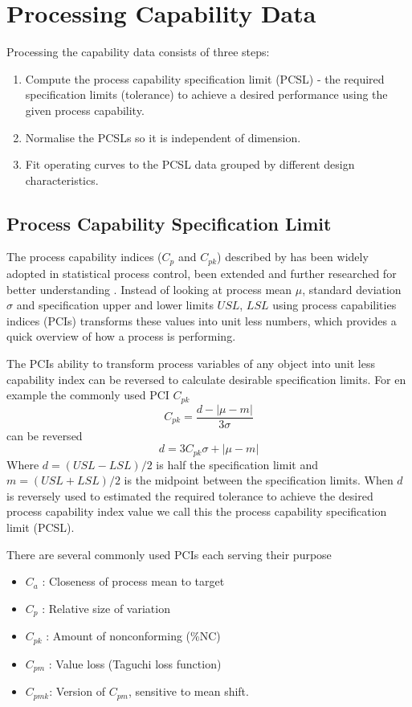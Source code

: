\documentclass[aip,amsmath, reprint, author-year]{revtex4-1}
\begin{document}
\section{Processing Capability Data}

Processing the capability data consists of three steps: 

\begin{enumerate}
	\item Compute the process capability specification limit (PCSL) - the required specification limits (tolerance) to achieve a desired performance using the given process capability.
	\item Normalise the PCSLs so it is independent of dimension.
	\item Fit operating curves to the PCSL data grouped by different design characteristics.
\end{enumerate}

\subsection{Process Capability Specification Limit}
The process capability indices ($C_p$ and $C_{pk}$) described by \cite{kane1986process} has been widely adopted in statistical process control, been extended and further researched for better understanding \citep{wu2009overview}. 
Instead of looking at process mean $\mu$, standard deviation $\sigma$ and specification upper and lower limits $USL$, $LSL$ using process capabilities indices (PCIs) transforms these values into unit less numbers, which provides a quick overview of how a process is performing.

The PCIs ability to transform process variables of any object into unit less capability index can be reversed to calculate desirable specification limits. For en example the commonly used PCI $C_{pk}$ 
\begin{equation}
	C_{pk} = \frac{d - | \mu - m|}{3 \sigma} \nonumber
\end{equation}
can be reversed
\begin{equation}
	d = 3 C_{pk} \sigma + | \mu - m|
\end{equation}
Where $d = (USL - LSL) / 2$ is half the specification limit and $m = (USL + LSL) / 2$ is the midpoint between the specification limits. When $d$ is reversely used to estimated the required tolerance to achieve the desired process capability index value we call this the process capability specification limit (PCSL). 

There are several commonly used PCIs each serving their purpose \citep{wu2009overview, taguchi1986introduction}
\begin{itemize}
	\item $C_a$ : Closeness of process mean to target 
	\item $C_p$ : Relative size of variation
	\item $C_{pk}$ : Amount of nonconforming (\%NC)
	\item $C_{pm}$ : Value loss (Taguchi loss function)
	\item $C_{pmk}$: Version of $C_{pm}$,  sensitive to mean shift. 
\end{itemize}
\end{document}
